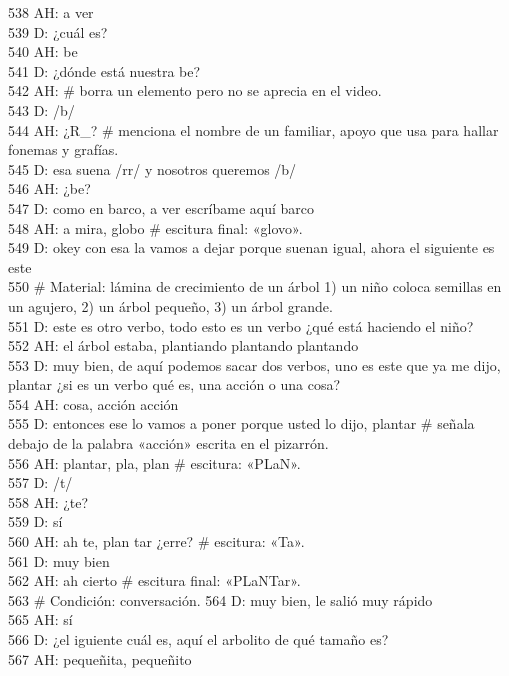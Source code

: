 538 AH: a ver\\
539 D: ¿cuál es?\\
540 AH: be\\
541 D: ¿dónde está nuestra be?\\
542 AH: \# borra un elemento pero no se aprecia en el video.\\
543 D: /b/\\
544 AH: ¿R\_? \# menciona el nombre de un familiar, apoyo que usa para hallar fonemas y grafías.\\
545 D: esa suena /rr/ y nosotros queremos /b/\\
546 AH: ¿be?\\
547 D: como en barco, a ver escríbame aquí barco\\
548 AH: a mira, globo \# escitura final: «glovo».\\
549 D: okey con esa la vamos a dejar porque suenan igual, ahora el siguiente es este \\
550 \# Material: lámina de crecimiento de un árbol 1) un niño coloca semillas en un agujero, 2) un árbol pequeño, 3) un árbol grande.\\
551 D: este es otro verbo, todo esto es un verbo ¿qué está haciendo el niño?\\
552 AH: el árbol estaba, plantiando plantando plantando\\
553 D: muy bien, de aquí podemos sacar dos verbos, uno es este que ya me dijo, plantar ¿si es un verbo qué es, una acción o una cosa?\\
554 AH: cosa, acción acción\\
555 D: entonces ese lo vamos a poner porque usted lo dijo, plantar \# señala debajo de la palabra «acción» escrita en el pizarrón.\\
556 AH: plantar, pla, plan \# escitura: «PLaN».\\
557 D: /t/\\
558 AH: ¿te?\\
559 D: sí\\
560 AH: ah te, plan tar ¿erre? \# escitura: «Ta».\\
561 D: muy bien\\
562 AH: ah cierto \# escitura final: «PLaNTar».\\
563 \# Condición: conversación.
564 D: muy bien, le salió muy rápido\\
565 AH: sí\\
566 D: ¿el iguiente cuál es, aquí el arbolito de qué tamaño es?\\
567 AH: pequeñita, pequeñito\\
